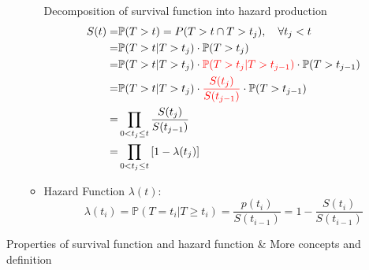 \begin{itemize}[topsep=2pt,itemsep=0pt]
\begin{itemize}[topsep=2pt,itemsep=0pt]
        Decomposition of survival function into hazard production
        \begin{align}\label{EqaSurvivalFunctionDecomposition}
            S(t)=&\mathbb{P}(T>t)=P(T>t\cap T>t_j),\quad \forall t_j<t\notag\\
            =&\mathbb{P}(T>t|T>t_j)\cdot \mathbb{P}(T>t_j)\notag\\
            =&\mathbb{P}(T>t|T>t_j)\cdot {\color{red} \mathbb{P}(T>t_j|T>t_{j-1})}\cdot \mathbb{P}(T>t_{j-1})\notag\\
            =&\mathbb{P}(T>t|T>t_j)\cdot {\color{red}\dfrac{S(t_j)}{S(t_{j-1})}}\cdot \mathbb{P}(T>t_{j-1})\notag\\
            =&\prod_{0<t_j\leq t}\dfrac{S(t_j)}{S(t_{j-1})}\notag\\
            =&\prod_{0<t_j\leq t}\left[ 1-\lambda (t_j) \right] 
        \end{align}

        \item Hazard Function $ \lambda (t) $:
        \begin{equation}
            \lambda (t_i)=\mathbb{P}(T=t_i|T\geq t_i)=\dfrac{p(t_i)}{S(t_{i-1})} =1-\dfrac{S(t_i)}{S(t_{i-1})}
        \end{equation}
        
        
        
    \end{itemize}
    
        
\end{itemize}


\begin{point}
    Properties of survival function and hazard function \& More concepts and definition
\end{point}

